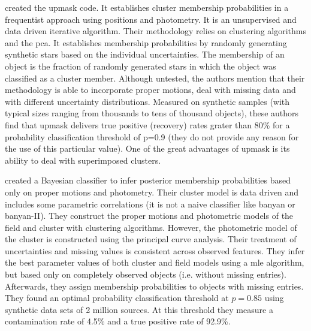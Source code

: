 \citet{KroneMartins2014} created the \gls{upmask} code. It establishes cluster membership probabilities in a frequentist approach using positions and photometry. It is an unsupervised and data driven iterative algorithm. Their methodology relies on clustering algorithms and the \gls{pca}. It establishes membership probabilities by randomly generating synthetic stars based on the individual uncertainties. The membership of an object is the fraction of randomly generated stars in which the object was classified as a cluster member. Although untested, the authors mention that their methodology is able to incorporate proper motions, deal with missing data and with different uncertainty distributions. Measured on synthetic samples (with typical sizes ranging from thousands to tens of thousand objects), these authors find that \gls{upmask} delivers true positive (recovery) rates grater than 80\% for a probability classification threshold of p=0.9 (they do not provide any reason for the use of this particular value). One of the great advantages of \gls{upmask} is its ability to deal with superimposed clusters. 

\citet{Sarro2014} created a Bayesian classifier to infer posterior membership probabilities based only on proper motions and photometry. Their cluster model is data driven and includes some parametric correlations (it is not a naive classifier like \gls{banyan} or \gls{banyan}-II). They construct the proper motions and photometric models of the field and cluster with clustering algorithms. However, the photometric model of the cluster is constructed using the principal curve analysis. Their treatment of uncertainties and missing values is consistent across observed features. They infer the best parameter values of both cluster and field models using a \gls{mle} algorithm, but based only on completely observed objects (i.e. without missing entries). Afterwards, they assign membership probabilities to objects with missing entries. They found an optimal probability classification threshold at $p=0.85$ using synthetic data sets of 2 million sources. At this threshold they measure a contamination rate of 4.5\% and a true positive rate of 92.9\%.

